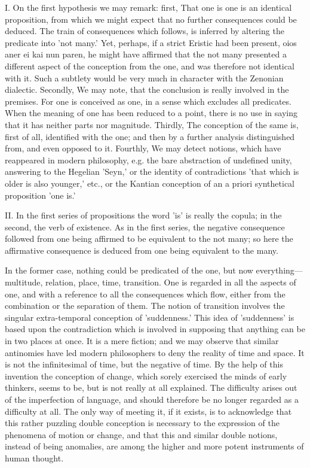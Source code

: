 \documentclass[11pt,letter]{article}
\begin{document}
\par  I. On the first hypothesis we may remark: first, That one is one is an identical proposition, from which we might expect that no further consequences could be deduced. The train of consequences which follows, is inferred by altering the predicate into 'not many.' Yet, perhaps, if a strict Eristic had been present, oios aner ei kai nun paren, he might have affirmed that the not many presented a different aspect of the conception from the one, and was therefore not identical with it. Such a subtlety would be very much in character with the Zenonian dialectic. Secondly, We may note, that the conclusion is really involved in the premises. For one is conceived as one, in a sense which excludes all predicates. When the meaning of one has been reduced to a point, there is no use in saying that it has neither parts nor magnitude. Thirdly, The conception of the same is, first of all, identified with the one; and then by a further analysis distinguished from, and even opposed to it. Fourthly, We may detect notions, which have reappeared in modern philosophy, e.g. the bare abstraction of undefined unity, answering to the Hegelian 'Seyn,' or the identity of contradictions 'that which is older is also younger,' etc., or the Kantian conception of an a priori synthetical proposition 'one is.'

\par  II. In the first series of propositions the word 'is' is really the copula; in the second, the verb of existence. As in the first series, the negative consequence followed from one being affirmed to be equivalent to the not many; so here the affirmative consequence is deduced from one being equivalent to the many.

\par  In the former case, nothing could be predicated of the one, but now everything—multitude, relation, place, time, transition. One is regarded in all the aspects of one, and with a reference to all the consequences which flow, either from the combination or the separation of them. The notion of transition involves the singular extra-temporal conception of 'suddenness.' This idea of 'suddenness' is based upon the contradiction which is involved in supposing that anything can be in two places at once. It is a mere fiction; and we may observe that similar antinomies have led modern philosophers to deny the reality of time and space. It is not the infinitesimal of time, but the negative of time. By the help of this invention the conception of change, which sorely exercised the minds of early thinkers, seems to be, but is not really at all explained. The difficulty arises out of the imperfection of language, and should therefore be no longer regarded as a difficulty at all. The only way of meeting it, if it exists, is to acknowledge that this rather puzzling double conception is necessary to the expression of the phenomena of motion or change, and that this and similar double notions, instead of being anomalies, are among the higher and more potent instruments of human thought.
\end{document}
